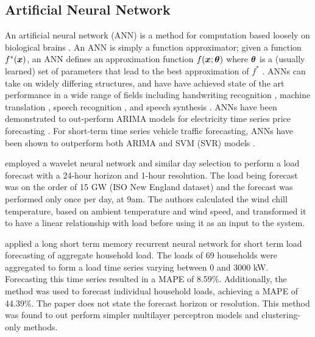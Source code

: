 \subsection{Artificial Neural Network}
An artificial neural network (ANN) is a method for computation based loosely on biological brains \citep{negnevitsky2005artificial}.
An ANN is simply a function approximator; given a function $f^*({\bm{x}})$, an ANN defines an approximation function $f({\bm{x}}; {\bm{\theta}})$ where ${\bm{\theta}}$ is a (usually learned) set of parameters that lead to the best approximation of $f^*$ \citep{Goodfellow-et-al-2016}. 
ANNs can take on widely differing structures, and have have achieved state of the art performance in a wide range of fields including handwriting recognition \citep{2017arXiv171009829S}, machine translation \citep{Vaswani2017}, speech recognition \citep{Chiu2017}, and speech synthesis \citep{DBLP:journals/corr/OordDZSVGKSK16}.
ANNs have been demonstrated to out-perform ARIMA models for electricity time series price forecasting \citep{Mandal2010}.
For short-term time series vehicle traffic forecasting, ANNs have been shown to outperform both ARIMA and SVM (SVR) models \cite{Zhao2017}.

\citet{Chen2010} employed a wavelet neural network and similar day selection to perform a load forecast with a 24-hour horizon and 1-hour resolution.
The load being forecast was on the order of 15 GW (ISO New England dataset) and the forecast was performed only once per day, at 9am.
The authors calculated the wind chill temperature, based on ambient temperature and wind speed, and transformed it to have a linear relationship with load before using it as an input to the system.

\citet{Kong2017}\cite{Kong2018} applied a long short term memory recurrent neural network for short term load forecasting of aggregate household load.
The loads of 69 households were aggregated to form a load time series varying between 0 and 3000 kW.
Forecasting this time series resulted in a MAPE of 8.59\%.
Additionally, the method was used to forecast individual household loads, achieving a MAPE of 44.39\%.
The paper does not state the forecast horizon or resolution.
This method was found to out perform simpler multilayer perceptron models and clustering-only methods.

